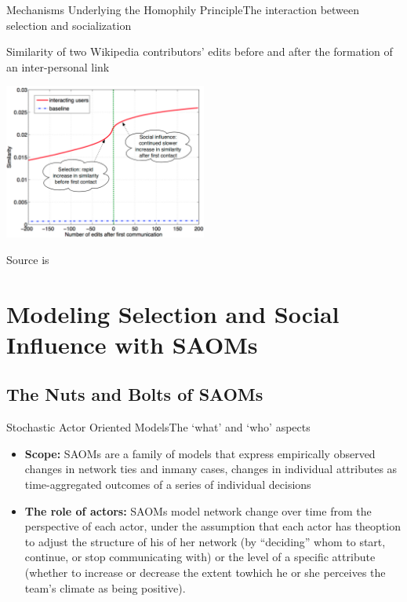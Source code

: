 \documentclass[notes, aspectratio=1610]{beamer}
\begin{document}
\begin{frame}{Mechanisms Underlying the Homophily Principle}{The interaction 
	between selection and socialization}
	\centering 

	\small Similarity of two Wikipedia contributors' edits before and after 
	the formation of an inter-personal link

	\includegraphics[width=0.5\textwidth]{images/selection_and_socialization.png}

	\footnotesize Source is \cite{easley2010}
\end{frame}

\section{Modeling Selection and Social Influence with SAOMs}

\subsection{The Nuts and Bolts of SAOMs}

\begin{frame}{Stochastic Actor Oriented Models}{The `what' and `who' aspects}
	\begin{itemize}
		\item 
		\textbf{Scope:} SAOMs are a family of models that 
		express empirically observed changes in network ties and 
		inmany cases, changes in individual attributes as 
		time-aggregated outcomes of a series of individual decisions 
		\cite{snijders_2016}
		\item
		\textbf{The role of actors:} SAOMs model network change over time from the 
		perspective of each actor, under the assumption that each actor 
		has theoption to adjust the structure of his of her network 
		(by ``deciding'' whom to start, continue, or stop communicating 
		with) or the level of a specific attribute (whether to increase 
		or decrease the extent towhich he or she perceives the team's 
		climate as being positive). 
	\end{itemize}
\end{frame}
\end{document}
